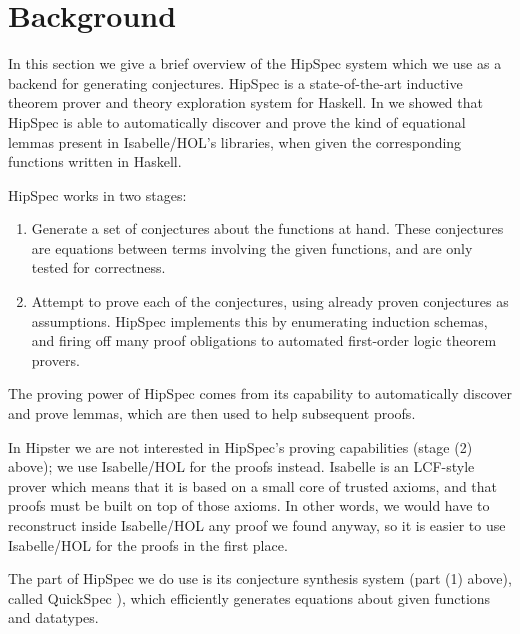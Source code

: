 \section{Background}
\label{sec:background}

In this section we give a brief overview of the HipSpec system which
we use as a backend for generating conjectures. HipSpec is a
state-of-the-art inductive theorem prover and theory exploration
system for Haskell. In \cite{hipspecCADE} we showed that HipSpec is
able to automatically discover and prove the kind of equational lemmas present in
Isabelle/HOL's libraries, when given the corresponding functions written in Haskell.

HipSpec works in two stages:
\begin{enumerate}
\item Generate a set of conjectures about the functions at hand. These conjectures are equations between terms involving the given functions, and are only tested for correctness.

\item Attempt to prove each of the conjectures, using already proven conjectures as assumptions. HipSpec implements this by enumerating induction schemas, and firing off many proof obligations to automated first-order logic theorem provers.
\end{enumerate}
The proving power of HipSpec comes from its capability to
automatically discover and prove lemmas, which are then used to help
subsequent proofs.

In Hipster we are not interested in HipSpec's
proving capabilities (stage (2) above); we use Isabelle/HOL for the proofs instead. Isabelle is an LCF-style prover which means that it is based on a small core of trusted axioms, and that proofs must be built
on top of those axioms. In other words, we would have to reconstruct
inside Isabelle/HOL any proof we found anyway, so it is easier to use
Isabelle/HOL for the proofs in the first place.

The part of HipSpec we do use
is its conjecture synthesis system (part (1) above), called QuickSpec \cite{quickspec}),
which efficiently generates equations about given functions and
datatypes.

